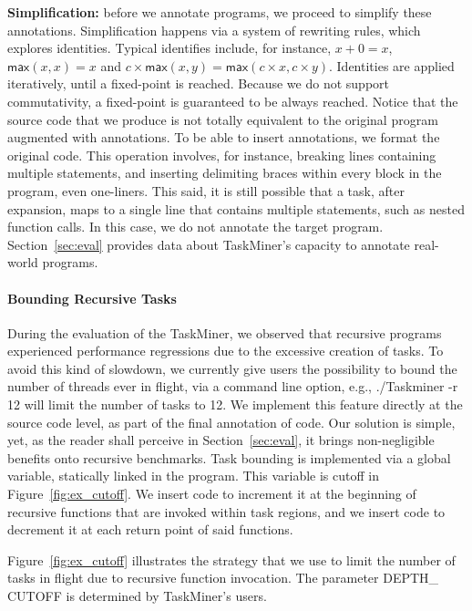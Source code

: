 \documentclass[sigplan,10pt,screen]{acmart}
\newcommand\Taskminer{\mbox{\textsf{TaskMiner}}}
\begin{document}
\noindent
\textbf{Simplification:}
before we annotate programs, we proceed to simplify these annotations.
Simplification happens via a system of rewriting rules, which explores 
identities.
Typical identifies include, for instance, $x + 0 = x$,
$\mathsf{max}(x, x) = x$ and $c \times \mathsf{max}(x, y) =
\mathsf{max}(c \times x, c \times y)$.
Identities are applied iteratively, until a fixed-point is reached.
Because we do not support commutativity, a fixed-point is guaranteed to be
always reached.
Notice that the source code that we produce is not totally equivalent to the
original program augmented with annotations.
To be able to insert annotations, we format the original code.
This operation involves, for instance, breaking lines containing multiple
statements, and inserting delimiting braces within every block in the program,
even one-liners.
This said, it is still possible that a task, after expansion, maps to a single
line that contains multiple statements, such as nested function calls.
In this case, we do not annotate the target program.
Section~\ref{sec:eval} provides data about \Taskminer's capacity to
annotate real-world programs.

\paragraph{Bounding Recursive Tasks}
During the evaluation of the \Taskminer, we observed that recursive
programs experienced performance regressions due to the excessive creation
of tasks.
To avoid this kind of slowdown, we currently give users the possibility to
bound the number of threads ever in flight, via a command line option, e.g.,
\textsf{./Taskminer -r 12} will limit the number of tasks to 12.
We implement this feature directly at the source code level, as part of the
final annotation of code.
Our solution is simple, yet, as the reader shall perceive in
Section~\ref{sec:eval}, it brings non-negligible benefits onto recursive
benchmarks.
Task bounding is implemented via a global variable, statically linked in the
program.
This variable is \textsf{cutoff} in Figure~\ref{fig:ex_cutoff}.
We insert code to increment it at the beginning of recursive functions that
are invoked within task regions, and we insert code to decrement it at each
return point of said functions.

\begin{example}
Figure~\ref{fig:ex_cutoff} illustrates the strategy that we
use to limit the number of tasks in flight due to recursive function
invocation.
The parameter \textsf{DEPTH\_ CUTOFF} is determined by \Taskminer's users.
\end{example}
\end{document}

